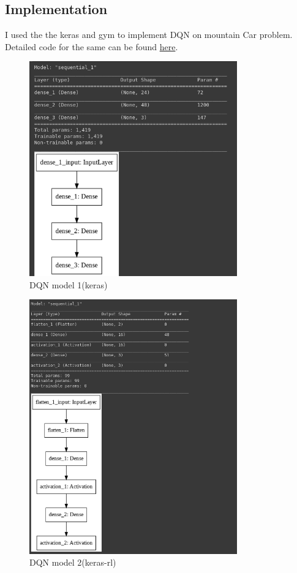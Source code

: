 \subsection{Implementation}
I used the the keras and gym to implement DQN on mountain Car problem. Detailed code for the same can be found \href{https://github.com/iamrajee/Slam_and_RL_BTP/tree/master/code/AI/mountainCar/dqn}{here}.
\begin{figure}[H]
    \centering
    \includegraphics[width=0.8\textwidth]{images/dqnmodel1.png}
    \caption{DQN model 1(keras)}
\end{figure}
\begin{figure}[H]
    \centering
    \includegraphics[width=0.8\textwidth]{images/dqnmodel2.png}
    \caption{DQN model 2(keras-rl)}
\end{figure}


